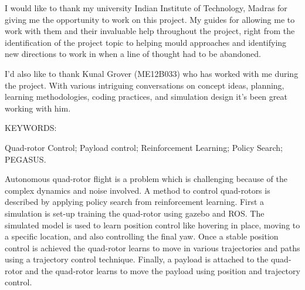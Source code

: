 \documentclass[hidelinks,BTech]{iitmdiss}
\begin{document}
\acknowledgements

I would like to thank my university Indian Institute of Technology, Madras for giving me the opportunity to work on this project. My guides for allowing me to work with them and their invaluable help throughout the project, right from the identification of the project topic to helping mould approaches and identifying new directions to work in when a line of thought had to be abandoned.

I'd also like to thank Kunal Grover (ME12B033) who has worked with me during the project. With various intriguing conversations on concept ideas, planning, learning methodologies, coding practices, and simulation design it's been great working with him.


\abstract

\noindent KEYWORDS: \hspace*{0.5em} \parbox[t]{4.4in}{Quad-rotor Control; Payload control; Reinforcement Learning; Policy Search; PEGASUS.}

\vspace*{24pt}

\noindent Autonomous quad-rotor flight is a problem which is challenging because of the complex dynamics and noise involved. A method to control quad-rotors is described by applying policy search from reinforcement learning. First a simulation is set-up training the quad-rotor using gazebo and ROS. The simulated model is used to learn position control like hovering in place, moving to a specific location, and also controlling the final yaw. Once a stable position control is achieved the quad-rotor learns to move in various trajectories and paths using a trajectory control technique. Finally, a payload is attached to the quad-rotor and the quad-rotor learns to move the payload using position and trajectory control.

\pagebreak


\begin{singlespace}
\clearpage
{}
{}
\tableofcontents


\listoffigures
{}
\end{singlespace}
\end{document}
